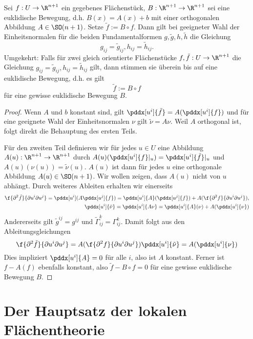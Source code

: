 \begin{lem}
	Sei $f: U \to \R^{n+1}$ ein gegebenes Flächenstück, $B: \R^{n+1} \to \R^{n+1}$ sei eine euklidische Bewegung, d.h. $B(x) = A(x) + b$ mit einer orthogonalen Abbildung $A \in \SO(n+1)$.
	Setze $\tilde f := B \circ f$.
	Dann gilt bei geeigneter Wahl der Einheitsnormalen für die beiden Fundamentalformen $g, \tilde g, h, \tilde h$ die Gleichung
	\[
		g_{ij} = \tilde g_{ij},
		h_{ij} = \tilde h_{ij}.
	\]
	Umgekehrt: Falls für zwei gleich orientierte Flächenstücke $f, \tilde f: U \to \R^{n+1}$ die Gleichung $g_{ij} = \tilde g_{ij}, h_{ij} = \tilde h_{ij}$ gilt, dann stimmen sie überein bis auf eine euklidische Bewegung, d.h. es gilt
	\[
		\tilde f := B \circ f
	\]
	für eine gewisse euklidische Bewegung $B$.
	\begin{proof}
		Wenn $A$ und $b$ konstant sind, gilt $\pddx[u^i]{\tilde f} = A(\pddx[u^i]{f})$ und für eine geeignete Wahl der Einheitsnormalen $\nu$ gilt $\tilde \nu = A\nu$.
		Weil $A$ orthogonal ist, folgt direkt die Behauptung des ersten Teils.

		Für den zweiten Teil definieren wir für jedes $u \in U$ eine Abbildung $A(u): \R^{n+1} \to \R^{n+1}$ durch $A(u)(\pddx[u^i]{f}|_u) = \pddx[u^i]{\tilde f}|_u$ und $A(u)(\nu(u)) = \tilde \nu(u)$.
		$A(u)$ ist dann für jedes $u$ eine orthogonale Abbildung $A(u) \in \SO(n+1)$.
		Wir wollen zeigen, dass $A(u)$ nicht von $u$ abhängt.
		Durch weiteres Ableiten erhalten wir einerseits
		\begin{align*}
			\f{\partial^2 \tilde f}{\partial u^i \partial u^j}
			= \pddx[u^i] (A \pddx[u^j]{f})
			= \pddx[u^i]{A} (\pddx[u^j]{f}) + A(\f{\partial^2 f}{\partial u^i \partial u^j}), \\
			\pddx[u^i]{\tilde \nu} = \pddx[u^i]{A\nu} = \pddx[u^i]{A}(\nu) + A (\pddx[u^i]{\nu})
		\end{align*}
		Andererseits gilt $\tilde g^{ij} = g^{ij}$ und $\tilde \Gamma_{ij}^k = \Gamma_{ij}^k$.
		Damit folgt aus den Ableitungsgleichungen
		\[
			\f{\partial^2 \tilde f}{\partial u^i \partial u^j}
			= A (\f{\partial^2 f}{\partial u^i \partial u^j})
			\pddx[u^i]{\tilde \nu} = A (\pddx[u^i]{\nu})
		\]
		Dies impliziert $\pddx[u^i]{A} = 0$ für alle $i$, also ist $A$ konstant.
		Ferner ist $f - A(f)$ ebenfalls konstant, also $\tilde f - B\circ f = 0$ für eine gewisse euklidische Bewegung $B$.
	\end{proof}
\end{lem}

\section{Der Hauptsatz der lokalen Flächentheorie}

